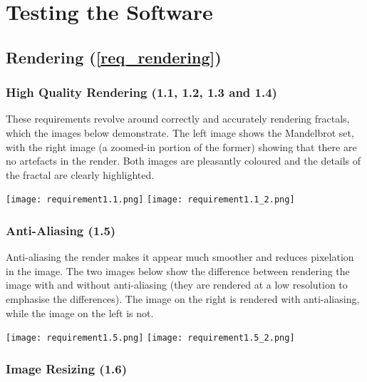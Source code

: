 \section{Testing the Software}

\subsection{Rendering (\ref{req_rendering})}

\subsubsection{High Quality Rendering (1.1, 1.2, 1.3 and 1.4)}

These requirements revolve around correctly and accurately rendering fractals, which the images below demonstrate. The left image shows the Mandelbrot set, with the right image (a zoomed-in portion of the former) showing that there are no artefacts in the render. Both images are pleasantly coloured and the details of the fractal are clearly highlighted.

\FloatBarrier
\begin{figure*}[htp]
	\centering
	\texttt{[image: requirement1.1.png]}
	\texttt{[image: requirement1.1\_2.png]}
\end{figure*}
\FloatBarrier

\subsubsection{Anti-Aliasing (1.5)}

Anti-aliasing the render makes it appear much smoother and reduces pixelation in the image. The two images below show the difference between rendering the image with and without anti-aliasing (they are rendered at a low resolution to emphasise the differences). The image on the right is rendered with anti-aliasing, while the image on the left is not.

\FloatBarrier
\begin{figure*}[htp]
	\centering
	\texttt{[image: requirement1.5.png]}
	\texttt{[image: requirement1.5\_2.png]}
\end{figure*}
\FloatBarrier

\subsubsection{Image Resizing (1.6)}

